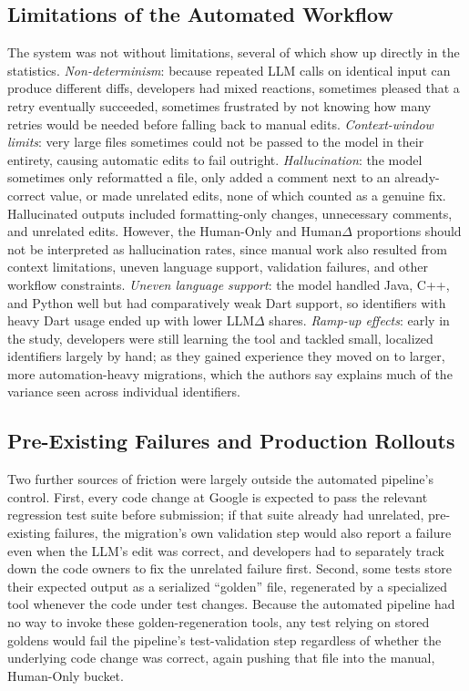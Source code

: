 \subsection{Limitations of the Automated Workflow}
The system was not without limitations, several of which show up
directly in the statistics. \emph{Non-determinism}: because repeated
LLM calls on identical input can produce different diffs, developers
had mixed reactions, sometimes pleased that a retry eventually
succeeded, sometimes frustrated by not knowing how many retries would
be needed before falling back to manual edits. \emph{Context-window
limits}: very large files sometimes could not be passed to the model
in their entirety, causing automatic edits to fail outright.
\emph{Hallucination}: the model sometimes only reformatted a file,
only added a comment next to an already-correct value, or made
unrelated edits, none of which counted as a genuine fix. Hallucinated outputs
 included formatting-only changes, unnecessary comments, and unrelated edits. 
 However, the Human-Only and Human$\Delta$ proportions should not be interpreted as 
 hallucination rates, since manual work also resulted from context 
 limitations, uneven language support, validation failures, and other 
 workflow constraints. \emph{Uneven language support}: the model
handled Java, C++, and Python well but had comparatively weak Dart
support, so identifiers with heavy Dart usage ended up with lower
LLM$\Delta$ shares. \emph{Ramp-up effects}: early in the study,
developers were still learning the tool and tackled small, localized
identifiers largely by hand; as they gained experience they moved on
to larger, more automation-heavy migrations, which the authors say
explains much of the variance seen across individual identifiers.

\subsection{Pre-Existing Failures and Production Rollouts}
Two further sources of friction were largely outside the automated
pipeline's control. First, every code change at Google is expected to
pass the relevant regression test suite before submission; if that
suite already had unrelated, pre-existing failures, the migration's
own validation step would also report a failure even when the LLM's
edit was correct, and developers had to separately track down the
code owners to fix the unrelated failure first. Second, some tests
store their expected output as a serialized ``golden'' file,
regenerated by a specialized tool whenever the code under test
changes. Because the automated pipeline had no way to invoke these
golden-regeneration tools, any test relying on stored goldens would
fail the pipeline's test-validation step regardless of whether the
underlying code change was correct, again pushing that file into the
manual, Human-Only bucket.

